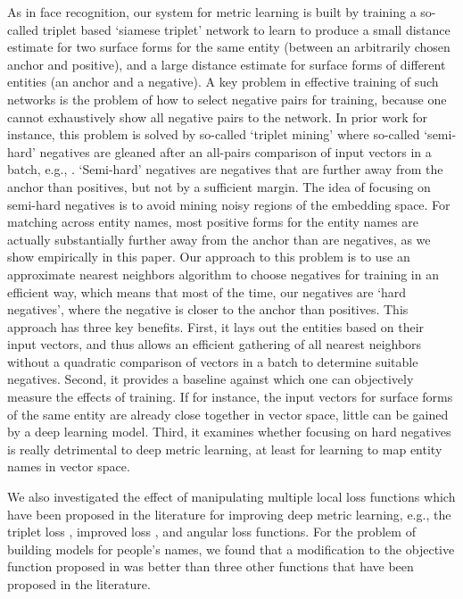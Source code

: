 As in face recognition, our system for metric learning is built by training a so-called triplet based `siamese triplet' network to learn to produce a small distance estimate for two surface forms for the same entity (between an arbitrarily chosen anchor and positive), and a large distance estimate for surface forms of different entities (an anchor and a negative).  A key problem in effective training of such networks is the problem of how to select negative pairs for training, because one cannot exhaustively show all negative pairs to the network.  In prior work for instance, this problem is solved by so-called `triplet mining' where so-called `semi-hard' negatives are gleaned after an all-pairs comparison of input vectors in a batch, e.g., \cite{DBLP:conf/cvpr/SchroffKP15}.  `Semi-hard' negatives are negatives that are further away from the anchor than positives, but not by a sufficient margin.  The idea of focusing on semi-hard negatives is to avoid mining noisy regions of the embedding space.  For matching across entity names, most positive forms for the entity names are actually substantially further away from the anchor than are negatives, as we show empirically in this paper.  Our approach to this problem is to use an approximate nearest neighbors algorithm to choose negatives for training in an efficient way, which means that most of the time, our negatives are `hard negatives', where the negative is closer to the anchor than positives.  This approach has three key benefits.  First, it lays out the entities based on their input vectors, and thus allows an efficient gathering of all nearest neighbors without a quadratic comparison of vectors in a batch to determine suitable negatives.  Second, it provides a baseline against which one can objectively measure the effects of training.  If for instance, the input vectors for surface forms of the same entity are already close together in vector space, little can be gained by a deep learning model.  Third, it examines whether focusing on hard negatives is really detrimental to deep metric learning, at least for learning to map entity names in vector space.

We also investigated the effect of manipulating multiple local loss functions which have been proposed in the literature for improving deep metric learning, e.g., the triplet loss \cite{DBLP:conf/cvpr/SchroffKP15}, improved loss \cite{Zhang:2016:DML:3088616.3088665}, and angular loss \cite{DBLP:journals/corr/abs-1708-01682} functions.  For the problem of building models for people's names, we found that a modification to the objective function proposed in \cite{DBLP:conf/cvpr/SchroffKP15} was better than three other functions that have been proposed in the literature. 

